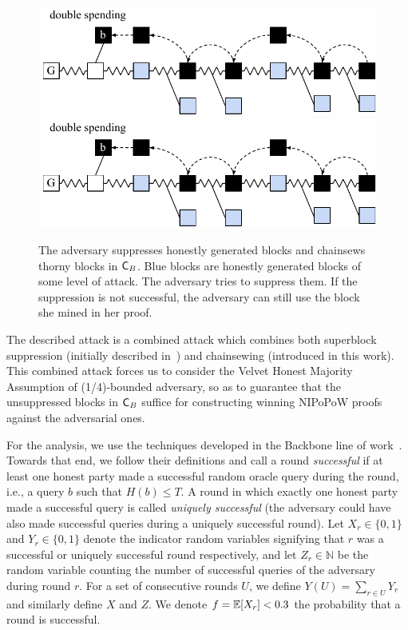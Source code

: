 \begin{figure}
    \begin{center}
        \iftwocolumn
            \includegraphics[width=0.95\columnwidth]{figures/attack_after_update-crop.pdf}
        \else
            \includegraphics[width=0.6\columnwidth]{figures/attack_after_update-crop.pdf}
        \fi
	\end{center}
	\caption{The adversary suppresses honestly generated blocks and chainsews thorny blocks in $\mathsf{C}_B$. Blue blocks are honestly generated blocks of some level of attack. The adversary tries to suppress them. If the suppression is not successful, the adversary can still use the block she mined in her proof.}
	\label{fig:attack_after_update}
\end{figure}

The described attack is a combined attack which combines both superblock suppression (initially described in~\cite{nipopows}) and chainsewing (introduced in this work). This combined attack forces us to consider the Velvet Honest Majority Assumption of (1/4)-bounded adversary, so as to guarantee that the unsuppressed blocks in $\mathsf{C}_B$ suffice for constructing winning NIPoPoW proofs against the adversarial ones.

For the analysis, we use the techniques
developed in the Backbone line of work~\cite{backbone}. Towards that end, we
follow their definitions and call a round \emph{successful} if at least one
honest party made a successful random oracle query during the round, i.e., a
query $b$ such that $H(b) \leq T$. A round in which exactly one honest party
made a successful query is called \emph{uniquely successful} (the adversary
could have also made successful queries during a uniquely successful round). Let
$X_r \in \{0, 1\}$ and $Y_r \in \{0, 1\}$ denote the indicator random variables
signifying that $r$ was a successful or uniquely successful round respectively,
and let $Z_r \in \mathbb{N}$ be the random variable counting the number of
successful queries of the adversary during round $r$. For a set of consecutive
rounds $U$, we define $Y(U) = \sum_{r \in U} Y_r$ and similarly define $X$ and
$Z$. We denote $f = \operatorname{\mathbb{E}}[X_r] < 0.3$ the probability that a round is successful.

